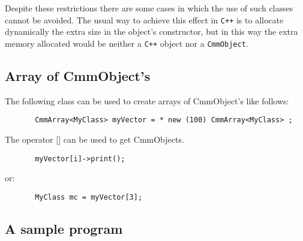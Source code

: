 Despite these restrictions there are some cases in which the use of such
classes cannot be avoided. The usual way to achieve this effect in {\tt C++}
is to allocate dynamically the extra size in the object's constructor, but in
this way the extra memory allocated would be neither a {\tt C++} object nor a
{\tt CmmObject}.

\subsection{Array of CmmObject's}

The following class can be used to create arrays of CmmObject's like follows:

\begin{verbatim}
       CmmArray<MyClass> myVector = * new (100) CmmArray<MyClass> ;
\end{verbatim}
       
The operator [] can be used to get CmmObjects.

\begin{verbatim}
       myVector[i]->print();
\end{verbatim}
or:
\begin{verbatim}
       MyClass mc = myVector[3];
\end{verbatim}

\subsection{A sample program}


